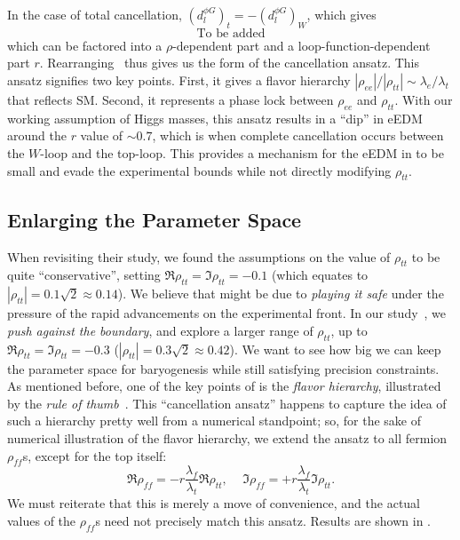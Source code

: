 In the case of total cancellation, \((d^{\phi G}_{l})_{t} = -(d^{\phi G}_{l})_{W}\), which gives
\begin{equation}\label{eq:exact-cancellation}
    \text{To be added}
\end{equation}
which can be factored into a \(\rho \)-dependent part and a loop-function-dependent part \(r \).
Rearranging~ thus gives us the form of the cancellation ansatz.
This ansatz signifies two key points.
First, it gives a flavor hierarchy \(|\rho_{ee}|/|\rho_{tt}|\sim\lambda_{e}/\lambda_{t} \) that reflects SM.
Second, it represents a phase lock between \(\rho_{ee} \) and \(\rho_{tt} \).
With our working assumption of Higgs masses, this ansatz results in a ``dip'' in eEDM around the \(r \) value of \(\sim 0.7 \),
which is when complete cancellation occurs between the \(W \)-loop and the top-loop.
This provides a mechanism for the eEDM in {\gthdm} to be small and evade the experimental bounds while not directly modifying \(\rho_{tt} \).

\subsection{Enlarging the Parameter Space}
When revisiting their study, we found the assumptions on the value of \(\rho_{tt} \) to be quite ``conservative'', setting \(\Re\rho_{tt} = \Im\rho_{tt} = -0.1 \) (which equates to \(|\rho_{tt}| = 0.1\sqrt{2} \approx 0.14\)).
We believe that might be due to \textit{playing it safe} under the pressure of the rapid advancements on the experimental front. 
In our study~\cite{HKT2024eEDMnEDM}, we \textit{push against the boundary}, and explore a larger range of \(\rho_{tt} \), up to \(\Re\rho_{tt} = \Im\rho_{tt} = -0.3 \) (\(|\rho_{tt}| = 0.3\sqrt{2} \approx 0.42\)). 
We want to see how big we can keep the parameter space for baryogenesis while still satisfying precision constraints.
As mentioned before, one of the key points of {\gthdm} is the \textit{flavor hierarchy}, illustrated by the \textit{rule of thumb}~.
This ``cancellation ansatz'' happens to capture the idea of such a hierarchy pretty well from a numerical standpoint; 
so, for the sake of numerical illustration of the flavor hierarchy, we extend the ansatz to all fermion \(\rho_{ff} \)s, except for the top itself:
\begin{equation}\label{eq:ansatz-extended}
    \Re\rho_{ff} = -r\frac{\lambda_{f}}{\lambda_{t}}\Re\rho_{tt} \text{, } \quad \Im\rho_{ff} = +r\frac{\lambda_{f}}{\lambda_{t}}\Im\rho_{tt}.
\end{equation}
We must reiterate that this is merely a move of convenience, and the actual values of the \(\rho_{ff} \)s need not precisely match this ansatz.
Results are shown in .


